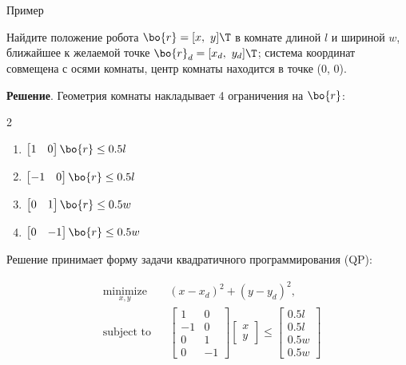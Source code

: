 \documentclass{beamer}
\begin{document}
\begin{frame}{Пример}
	\begin{flushleft}
		{\small 
		Найдите положение робота $\bo{r} = [x, \ y]\T$ в комнате длиной $l$ и шириной $w$, ближайшее к желаемой точке $\bo{r}_d= [x_d, \ y_d]\T$; система координат совмещена с осями комнаты, центр комнаты находится в точке (0, 0).
		
		\bigskip
		
		\hspace{-0.2in}
		\textbf{Решение}. Геометрия комнаты накладывает 4 ограничения на $\bo{r}$:
		
		\begin{multicols}{2}
			\begin{enumerate}
				\item $\begin{bmatrix} 1 & 0 \end{bmatrix} \bo{r} \leq 0.5 l$
				\item $\begin{bmatrix} -1 & 0 \end{bmatrix}  \bo{r} \leq 0.5 l$
				\item $\begin{bmatrix} 0 & 1 \end{bmatrix}  \bo{r} \leq 0.5 w$
				\item $\begin{bmatrix} 0 & -1 \end{bmatrix}  \bo{r} \leq 0.5 w$
			\end{enumerate}
		\end{multicols}
		
		Решение принимает форму задачи квадратичного программирования (QP):
		
		\begin{equation}
			\begin{aligned}
				& \underset{x, y}{\text{minimize}}
				& & (x-x_d)^2 + (y-y_d)^2, \\
				& \text{subject to}
				& & \begin{bmatrix} 1 & 0 \\ -1 & 0 \\ 0 & 1 \\ 0 & -1 \end{bmatrix}
				\begin{bmatrix} x \\ y \end{bmatrix}
				\leq
				\begin{bmatrix} 0.5 l \\ 0.5 l \\ 0.5 w \\ 0.5 w \end{bmatrix}
			\end{aligned}
		\end{equation}}
		
	\end{flushleft}
\end{frame}
\end{document}
